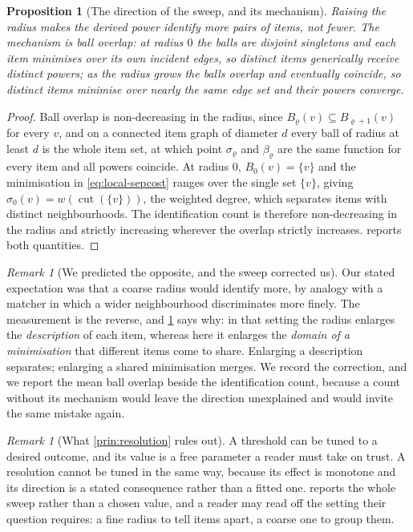 \documentclass[11pt,twocolumn,a4paper]{article}
\theoremstyle{plain}
\newtheorem{proposition}[theorem]{Proposition}
\theoremstyle{definition}
\theoremstyle{remark}
\newtheorem{remark}[theorem]{Remark}
\newcommand{\cut}{\operatorname{cut}}
\newcommand{\wt}{w}
\newcommand{\flo}{\beta}
\newcommand{\sepc}{\sigma}
\newcommand{\rad}{\varrho}
\begin{document}
\begin{proposition}[The direction of the sweep, and its mechanism]
\label{prop:sweep}
Raising the radius makes the derived power identify \emph{more} pairs of items,
not fewer. The mechanism is ball overlap: at radius $0$ the balls are disjoint
singletons and each item minimises over its own incident edges, so distinct
items generically receive distinct powers; as the radius grows the balls
overlap and eventually coincide, so distinct items minimise over nearly the
same edge set and their powers converge.
\end{proposition}

\begin{proof}
Ball overlap is non-decreasing in the radius, since $B_\rad(v)\subseteq
B_{\rad+1}(v)$ for every $v$, and on a connected item graph of diameter $d$
every ball of radius at least $d$ is the whole item set, at which point
$\sepc_\rad$ and $\flo_\rad$ are the same function for every item and all
powers coincide. At radius $0$, $B_0(v)=\{v\}$ and the minimisation in
\cref{eq:local-sepcost} ranges over the single set $\{v\}$, giving
$\sepc_0(v)=\wt(\cut(\{v\}))$, the weighted degree, which separates items with
distinct neighbourhoods. The identification count is therefore non-decreasing
in the radius and strictly increasing wherever the overlap strictly increases.
 reports both quantities.
\end{proof}

\begin{remark}[We predicted the opposite, and the sweep corrected us]
\label{rem:res-inverted}
Our stated expectation was that a coarse radius would identify more, by analogy
with a matcher in which a wider neighbourhood discriminates more finely. The
measurement is the reverse, and \cref{prop:sweep} says why: in that setting the
radius enlarges the \emph{description} of each item, whereas here it enlarges
the \emph{domain of a minimisation} that different items come to share.
Enlarging a description separates; enlarging a shared minimisation merges. We
record the correction, and we report the mean ball overlap beside the
identification count, because a count without its mechanism would leave the
direction unexplained and would invite the same mistake again.
\end{remark}

\begin{remark}[What \cref{prin:resolution} rules out]
\label{rem:res-rules-out}
A threshold can be tuned to a desired outcome, and its value is a free
parameter a reader must take on trust. A resolution cannot be tuned in the same
way, because its effect is monotone and its direction is a stated consequence
rather than a fitted one.  reports the whole sweep rather
than a chosen value, and a reader may read off the setting their question
requires: a fine radius to tell items apart, a coarse one to group them.
\end{remark}
\end{document}
